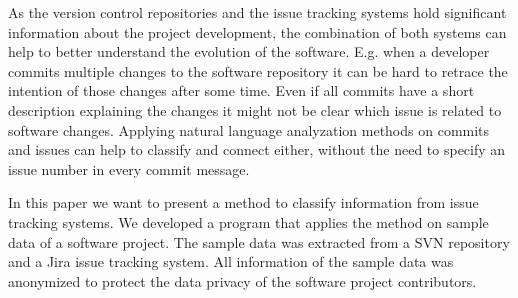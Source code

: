 As the version control repositories and the issue tracking systems hold significant information about the project development, the combination of both systems can help to better understand the evolution of the software. E.g. when a developer commits multiple changes to the software repository it can be hard to retrace the intention of those changes after some time. Even if all commits have a short description explaining the changes it might not be clear which issue is related to software changes. Applying natural language analyzation methods on commits and issues can help to classify and connect either, without the need to specify an issue number in every commit message.

In this paper we want to present a method to classify information from issue tracking systems. We developed a program that applies the method on sample data of a software project. The sample data was extracted from a SVN repository and a Jira issue tracking system. All information of the sample data was anonymized to protect the data privacy of the software project contributors.
